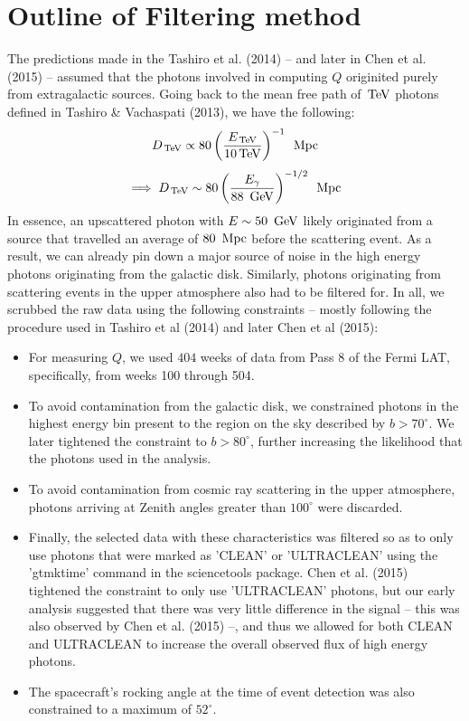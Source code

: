 \section{Outline of Filtering method}
The predictions made in the Tashiro et al. (2014) -- and later in Chen et al.
(2015) -- assumed that the photons involved in computing $Q$ originited
purely from extragalactic sources. 
Going back to the mean free path of $\,{\rm TeV}$ photons defined in 
Tashiro \& Vachaspati (2013), we have the following:
$$ D_{\,{\rm TeV}} \propto 80\left(\frac{E_{\,{\rm TeV}}}{10 \,{\rm TeV}}\right)^{-1}\ \,{\rm Mpc}$$
\begin{equation}
	\implies D_{\TeV} \sim 80\left(\frac{E_{\gamma}}{88\ \GeV}\right)^{-1/2}\ \Mpc
\end{equation}
In essence, an upscattered photon with $E \sim 50\ \,{\rm GeV}$ likely originated
from a source that travelled an average of $80\ \Mpc$ before the scattering event.
As a result, we can already pin down a major source of noise in the high energy 
photons originating from the galactic disk.
Similarly, photons originating from scattering events in the upper atmosphere
also had to be filtered for.
In all, we scrubbed the raw data using the following constraints -- mostly
following the procedure used in Tashiro et al (2014) and later Chen et al (2015):
\begin{itemize}
\item For measuring $Q$, we used $404$ weeks of data from Pass 8 of the Fermi 
	LAT, specifically, from weeks 100 through 504.
\item To avoid contamination from the galactic disk, we constrained photons in
	the highest energy bin present to the region on the sky described by 
	$b > 70^{\circ}$. We later tightened the constraint to $b > 80^{\circ}$, 
	further increasing the likelihood that the photons used in the analysis.  
\item To avoid contamination from cosmic ray scattering in the upper
	atmosphere, photons arriving at Zenith angles greater than $100^{\circ}$ 
	were discarded.
\item Finally, the selected data with these characteristics was filtered so as
	to only use photons that were marked as 'CLEAN' or 'ULTRACLEAN'
	using the 'gtmktime' command in the sciencetools package. 
	Chen et al. (2015) tightened the constraint to only use 'ULTRACLEAN' photons,
	but our early analysis suggested that there was very little difference in the
	signal -- this was also observed by Chen et al. (2015) --, and thus we 
	allowed for both CLEAN and ULTRACLEAN to increase the overall observed 
	flux of high energy photons.
\item The spacecraft's rocking angle at the time of event detection was also 
	constrained to a maximum of $52^{\circ}$.
\end{itemize}

